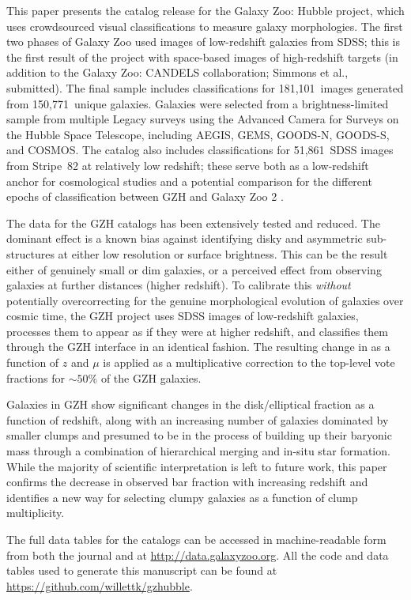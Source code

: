 \documentclass[twocolumn]{aastex6}
\begin{document}
This paper presents the catalog release for the Galaxy Zoo: Hubble project,
which uses crowdsourced visual classifications to measure galaxy morphologies.
The first two phases of Galaxy Zoo \citep{lin11,wil13} used images of
low-redshift galaxies from SDSS; this is the first result of the project with
space-based images of high-redshift targets (in addition to the Galaxy Zoo:
CANDELS collaboration; Simmons et al., submitted). The final sample includes
classifications for 181,101~images generated from 150,771~unique galaxies.
Galaxies were selected from a brightness-limited sample from multiple Legacy
surveys using the Advanced Camera for Surveys on the Hubble Space Telescope,
including AEGIS, GEMS, GOODS-N, GOODS-S, and COSMOS. The catalog also includes
classifications for 51,861~SDSS images from Stripe~82 at
relatively low redshift; these serve both as a low-redshift anchor for
cosmological studies and a potential comparison for the different epochs of
classification between GZH and Galaxy Zoo 2 \citep{wil13}. 

The data for the GZH catalogs has been extensively tested and reduced. The
dominant effect is a known bias against identifying disky and asymmetric
sub-structures at either low resolution or surface brightness. This can be the
result either of genuinely small or dim galaxies, or a perceived effect from
observing galaxies at further distances (higher redshift). To calibrate this
\emph{without} potentially overcorrecting for the genuine morphological
evolution of galaxies over cosmic time, the GZH project uses SDSS images of
low-redshift galaxies, processes them to appear as if they were at higher
redshift, and classifies them through the GZH interface in an identical
fashion. The resulting change in \ffeatures{} as a function of $z$ and $\mu$ is
applied as a multiplicative correction to the top-level vote fractions for
$\sim50\%$ of the GZH galaxies. 

Galaxies in GZH show significant changes in the disk/elliptical fraction as a
function of redshift, along with an increasing number of galaxies dominated by
smaller clumps and presumed to be in the process of building up their baryonic
mass through a combination of hierarchical merging and in-situ star formation.
While the majority of scientific interpretation is left to future work, this
paper confirms the decrease in observed bar fraction with increasing redshift
\citep{mel14} and identifies a new way for selecting clumpy galaxies as a
function of clump multiplicity.

The full data tables for the catalogs can be accessed in machine-readable form
from both the journal and at \url{http://data.galaxyzoo.org}. All the code and
data tables used to generate this manuscript can be found at
\url{https://github.com/willettk/gzhubble}.
 
\end{document}
